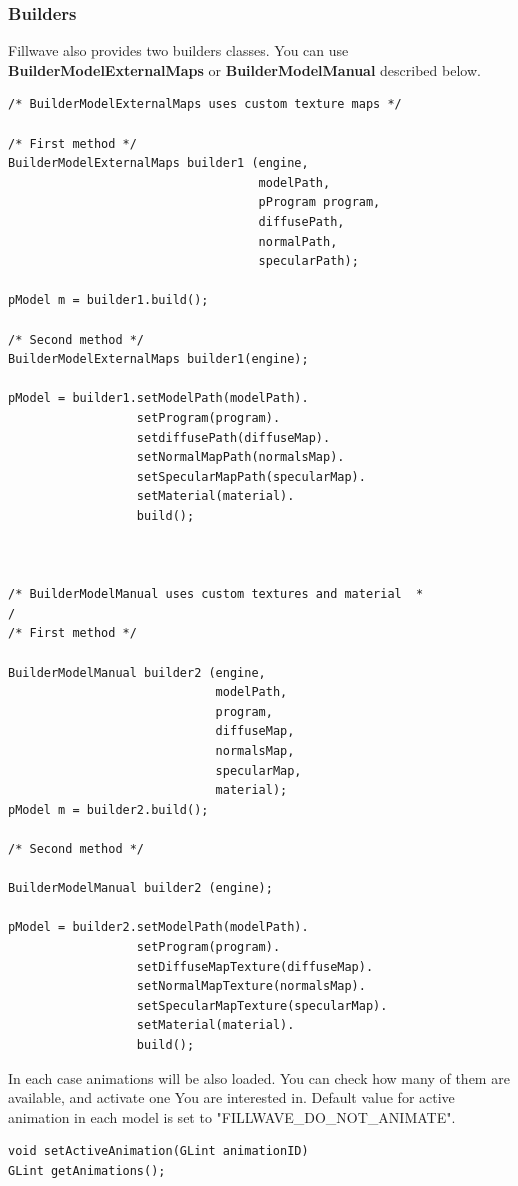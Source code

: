 \documentclass{article}
\begin{document}
\subsubsection{Builders}\label{sec:builderCreation}
\indent \indent Fillwave also provides two builders classes. You can use \textbf{BuilderModelExternalMaps} or \textbf{BuilderModelManual} described below.
\begin{lstlisting}
/* BuilderModelExternalMaps uses custom texture maps */

/* First method */
BuilderModelExternalMaps builder1 (engine,
                                   modelPath,
                                   pProgram program,
                                   diffusePath,
                                   normalPath,
                                   specularPath);

pModel m = builder1.build();

/* Second method */
BuilderModelExternalMaps builder1(engine);

pModel = builder1.setModelPath(modelPath).
                  setProgram(program).
                  setdiffusePath(diffuseMap).
                  setNormalMapPath(normalsMap).
                  setSpecularMapPath(specularMap).
                  setMaterial(material).
                  build();



/* BuilderModelManual uses custom textures and material  *
/
/* First method */

BuilderModelManual builder2 (engine,
                             modelPath,
                             program,
                             diffuseMap,
                             normalsMap,
                             specularMap,
                             material);
pModel m = builder2.build();

/* Second method */

BuilderModelManual builder2 (engine);

pModel = builder2.setModelPath(modelPath).
                  setProgram(program).
                  setDiffuseMapTexture(diffuseMap).
                  setNormalMapTexture(normalsMap).
                  setSpecularMapTexture(specularMap).
                  setMaterial(material).
                  build();

\end{lstlisting}

\indent In each case animations will be also loaded. You can check how many of them are available, and activate one You are interested in. Default value for active animation in each model is set to "FILLWAVE\_DO\_NOT\_ANIMATE".
\begin{lstlisting}
void setActiveAnimation(GLint animationID)
GLint getAnimations();
\end{lstlisting}
\end{document}
